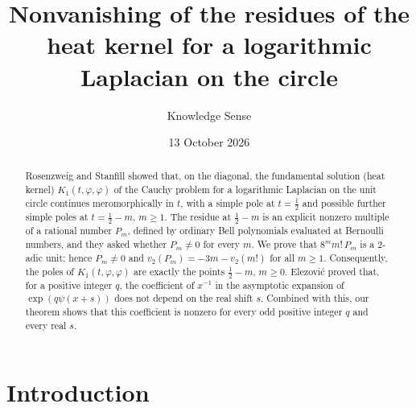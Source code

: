 \documentclass[11pt]{amsart}
\theoremstyle{definition}
\theoremstyle{remark}
\numberwithin{equation}{section}
\begin{document}
\title[Residues of the heat kernel for a logarithmic Laplacian]{Nonvanishing of the residues of the heat kernel for a logarithmic Laplacian on the circle}

\author{Knowledge Sense}
\address{Knowledge Sense}

\date{13 October 2026}



\begin{abstract}
Rosenzweig and Stanfill showed that, on the diagonal, the fundamental solution (heat kernel) $K_1(t,\varphi,\varphi)$ of the Cauchy problem for a logarithmic Laplacian on the unit circle continues meromorphically in $t$, with a simple pole at $t=\frac12$ and possible further simple poles at $t=\frac12-m$, $m\ge1$. The residue at $\frac12-m$ is an explicit nonzero multiple of a rational number $P_m$, defined by ordinary Bell polynomials evaluated at Bernoulli numbers, and they asked whether $P_m\neq0$ for every $m$. We prove that $8^m m!\,P_m$ is a $2$-adic unit; hence $P_m\ne0$ and $v_2(P_m)=-3m-v_2(m!)$ for all $m\ge1$. Consequently, the poles of $K_1(t,\varphi,\varphi)$ are exactly the points $\frac12-m$, $m\ge0$. Elezovi\'c proved that, for a positive integer $q$, the coefficient of $x^{-1}$ in the asymptotic expansion of $\exp(q\psi(x+s))$ does not depend on the real shift $s$. Combined with this, our theorem shows that this coefficient is nonzero for every odd positive integer $q$ and every real $s$.
\end{abstract}

\maketitle

\section{Introduction}
\end{document}

